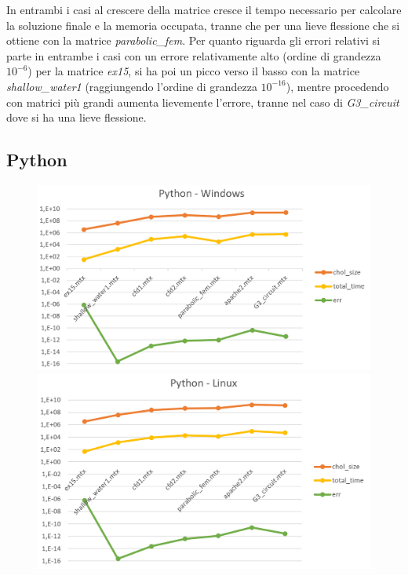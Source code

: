 \documentclass[a4paper,12pt]{article}
\begin{document}
\bigskip

In entrambi i casi al crescere della matrice cresce il tempo necessario per calcolare la soluzione finale e la memoria occupata, tranne che per una lieve flessione che si ottiene con la matrice \textit{parabolic\_fem}. 
Per quanto riguarda gli errori relativi si parte in entrambe i casi con un errore relativamente alto (ordine di grandezza $10^{-6}$) per la matrice \textit{ex15}, si ha poi un picco verso il basso con la matrice \textit{shallow\_water1} (raggiungendo l’ordine di grandezza $10^{-16}$), mentre procedendo con matrici più grandi aumenta lievemente l’errore, tranne nel caso di \textit{G3\_circuit} dove si ha una lieve flessione. 

\newpage

\subsection{Python}

\begin{figure}[H]
\centering
\begin{minipage}{.5\textwidth}
  \centering
  \includegraphics[width=1\linewidth]{img/pythonwin.png}
\end{minipage}%
\begin{minipage}{.5\textwidth}
  \centering
  \includegraphics[width=1\linewidth]{img/pythonlinux.png}
\end{minipage}
\end{figure}
\end{document}
